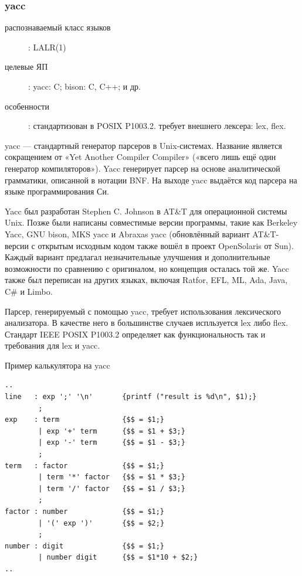 \documentclass[a4paper,12pt]{article}
\begin{document}
\subsubsection{yacc}
\begin{description}
  \item[распознаваемый класс языков]: LALR(1)
  \item[целевые ЯП]: yacc: C; bison: C, C++; и др.
  \item[особенности]: стандартизован в POSIX P1003.2. требует внешнего лексера: lex, flex.
\end{description}
yacc — стандартный генератор парсеров в Unix-системах. Название является
сокращением от «Yet Another Compiler Compiler» («всего лишь ещё один генератор
компиляторов»). Yacc генерирует парсер на основе аналитической грамматики,
описанной в нотации BNF. На выходе yacc выдаётся код парсера на языке
программирования Си.

Yacc был разработан Stephen C. Johnson в AT\&T для операционной системы Unix.
Позже были написаны совместимые версии программы, такие как Berkeley Yacc, GNU
bison, MKS yacc и Abraxas yacc (обновлённый вариант AT\&T-версии с открытым
исходным кодом также вошёл в проект OpenSolaris от Sun). Каждый вариант
предлагал незначительные улучшения и дополнительные возможности по сравнению с
оригиналом, но концепция осталась той же. Yacc также был переписан на других
языках, включая Ratfor, EFL, ML, Ada, Java, C\# и Limbo.

Парсер, генерируемый с помощью yacc, требует использования лексического
анализатора. В качестве него в большинстве случаев испльзуется lex либо
flex. Стандарт IEEE POSIX P1003.2 определяет как функциональность так и
требования для lex и yacc.

\begin{example}
Пример калькулятора на yacc
\end{example}
\begin{verbatim}
..
line   : exp ';' '\n'       {printf ("result is %d\n", $1);}
        ;
exp    : term               {$$ = $1;}
        | exp '+' term      {$$ = $1 + $3;}
        | exp '-' term      {$$ = $1 - $3;}
        ;
term   : factor             {$$ = $1;}
        | term '*' factor   {$$ = $1 * $3;}
        | term '/' factor   {$$ = $1 / $3;}
        ;
factor : number             {$$ = $1;}
        | '(' exp ')'       {$$ = $2;}
        ;
number : digit              {$$ = $1;}
        | number digit      {$$ = $1*10 + $2;}
..
\end{verbatim}
\end{document}

